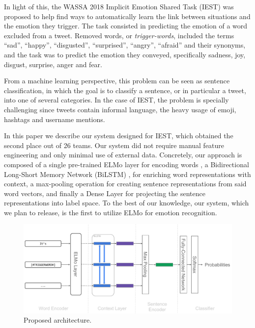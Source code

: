 \documentclass[11pt,a4paper]{article}
\newcommand{\Acronym}[1]{\mbox{#1}}
\begin{document}
In light of this, the \Acronym{WASSA} 2018 Implicit Emotion Shared Task
(\Acronym{IEST}) \cite{klinger2018iest} was proposed to help find ways to
automatically learn the link between situations and the emotion they trigger.
The task consisted in predicting the emotion of a word excluded from a tweet.
Removed words, or \textit{trigger-words}, included the terms ``sad'', ``happy'',
``disgusted'', ``surprised'', ``angry'', ``afraid'' and their synonyms, and the
task was to predict the emotion they conveyed, specifically sadness, joy,
disgust, surprise, anger and fear.

From a machine learning perspective, this problem can be seen as sentence
classification, in which the goal is to classify a sentence, or in particular a
tweet, into one of several categories. In the case of \Acronym{IEST}, the
problem is specially challenging since tweets contain informal language, the
heavy usage of emoji, hashtags and username mentions.

In this paper we describe our system designed for \Acronym{IEST}, which obtained
the second place out of 26 teams. Our system did not require manual feature
engineering and only minimal use of external data. Concretely, our approach is
composed of a single pre-trained \Acronym{ELMo} layer for encoding words
\cite{peters2018deep}, a Bidirectional Long-Short Memory Network
(\Acronym{BiLSTM}) \cite{graves2005framewise, graves2013speech}, for enriching
word representations with context, a max-pooling operation for creating sentence
representations from said word vectors, and finally a Dense Layer for projecting
the sentence representations into label space. To the best of our knowledge, our
system, which we plan to release, is the first to utilize ELMo for emotion
recognition. 




\begin{figure}
    \centering
    \includegraphics[scale=0.6]{images/iest_architecture.pdf}
    \caption{Proposed architecture.}
    \label{fig:architecture}
\end{figure}
\end{document}
